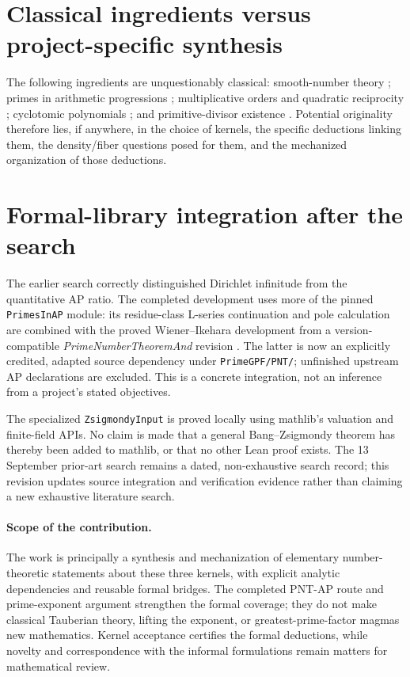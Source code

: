 \documentclass[11pt,a4paper,oneside,open=any,headings=small]{scrbook}
\theoremstyle{definition}
\newcommand{\lean}[1]{\ifmmode\text{\texttt{\detokenize{#1}}}\else\nolinkurl{#1}\fi}
\begin{document}
\section{Classical ingredients versus project-specific synthesis}
The following ingredients are unquestionably classical: smooth-number theory \parencite{Dickman1930,deBruijn1951,HildebrandTenenbaum1993}; primes in arithmetic progressions \parencite{Davenport2000}; multiplicative orders and quadratic reciprocity \parencite{IrelandRosen1990}; cyclotomic polynomials \parencite{Washington1997}; and primitive-divisor existence \parencite{Bang1886,Zsigmondy1892}. Potential originality therefore lies, if anywhere, in the choice of kernels, the specific deductions linking them, the density/fiber questions posed for them, and the mechanized organization of those deductions.

\section{Formal-library integration after the search}
The earlier search correctly distinguished Dirichlet infinitude from the quantitative AP ratio. The completed development uses more of the pinned \lean{PrimesInAP} module: its residue-class L-series continuation and pole calculation are combined with the proved Wiener--Ikehara development from a version-compatible \emph{PrimeNumberTheoremAnd} revision \parencite{MathlibPrimesInAP,PNTAndLean}. The latter is now an explicitly credited, adapted source dependency under \lean{PrimeGPF/PNT/}; unfinished upstream AP declarations are excluded. This is a concrete integration, not an inference from a project's stated objectives.

The specialized \lean{ZsigmondyInput} is proved locally using mathlib's valuation and finite-field APIs. No claim is made that a general Bang--Zsigmondy theorem has thereby been added to mathlib, or that no other Lean proof exists. The 13 September prior-art search remains a dated, non-exhaustive search record; this revision updates source integration and verification evidence rather than claiming a new exhaustive literature search.

\paragraph{Scope of the contribution.}
The work is principally a synthesis and mechanization of elementary number-theoretic statements about these three kernels, with explicit analytic dependencies and reusable formal bridges. The completed PNT-AP route and prime-exponent argument strengthen the formal coverage; they do not make classical Tauberian theory, lifting the exponent, or greatest-prime-factor magmas new mathematics. Kernel acceptance certifies the formal deductions, while novelty and correspondence with the informal formulations remain matters for mathematical review.
\end{document}

